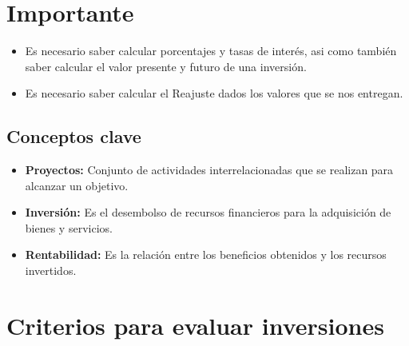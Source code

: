 \documentclass{templateNote}
\begin{document}


\portada
\margenes 
\tableofcontents
\newpage

\section{Importante}

\begin{itemize}
    \item Es necesario saber calcular porcentajes y tasas de interés, asi como también saber calcular el valor presente y futuro de una inversión.
    \item Es necesario saber calcular el Reajuste dados los valores que se nos entregan.
\end{itemize}

\subsection{Conceptos clave}

\begin{itemize}
    \item \textbf{Proyectos:} Conjunto de actividades interrelacionadas que se realizan para alcanzar un objetivo.
    \item \textbf{Inversión:} Es el desembolso de recursos financieros para la adquisición de bienes y servicios.
    \item \textbf{Rentabilidad:} Es la relación entre los beneficios obtenidos y los recursos invertidos.
\end{itemize}

\newpage
\section{Criterios para evaluar inversiones}
\end{document}
